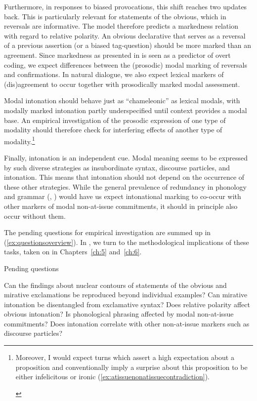 Furthermore, in responses to biased provocations, this shift reaches two updates back. This is particularly relevant for statements of the obvious, which in reversals are informative. The model therefore predicts a markedness relation with regard to relative polarity. An obvious declarative that serves as a reversal of a previous assertion (or a biased tag-question) should be more marked than an agreement. Since markedness as presented in  is seen as a predictor of overt coding, we expect differences between the (prosodic) modal marking of reversals and confirmations. In natural dialogue, we also expect lexical markers of (dis)\-a\-gree\-ment to occur together with prosodically marked modal assessment.

Modal intonation should behave just as ``chameleonic'' \citep[34]{FintelGillies.2007} as lexical modals, with modally marked intonation partly underspecified until context provides a modal base. An empirical investigation of the prosodic expression of one type of modality should therefore check for interfering effects of another type of modality.\footnote{Moreover, I would expect turns which assert a high expectation about a proposition and conventionally imply a surprise about this proposition to be either infelicitous or ironic (\ref{ex:atissuenonatissuecontradiction}).
	
\begin{exe}
\end{exe}}

Finally, intonation is an independent cue. Modal meaning seems to be expressed by such diverse strategies as insubordinate syntax, discourse particles, and intonation. This means that intonation should not depend on the occurrence of these other strategies. While the general prevalence of redundancy in phonology and grammar (\cite[184]{Pinker.1994}, \cite{Shannon.1948}) would have us expect intonational marking to co-occur with other markers of modal non-at-issue commitments, it should in principle also occur without them.

The pending questions for empirical investigation are summed up in (\ref{ex:questionsoverview}). In , we turn to the methodological implications of these tasks, taken on in Chapters~\ref{ch:5} and~\ref{ch:6}.

\begin{exe}
\ex Pending questions\label{ex:questionsoverview} 
\begin{xlist}\sloppy
	\ex Can the findings about nuclear contours of statements of the obvious and mirative exclamations be reproduced beyond individual examples? 
	\ex Can mirative intonation be disentangled from exclamative syntax? 
	\ex Does relative polarity affect obvious intonation? 
	\ex Is phonological phrasing affected by modal non-at-issue commitments? 
	\ex Does intonation correlate with other non-at-issue markers such as discourse particles? 
\end{xlist}
\end{exe}

